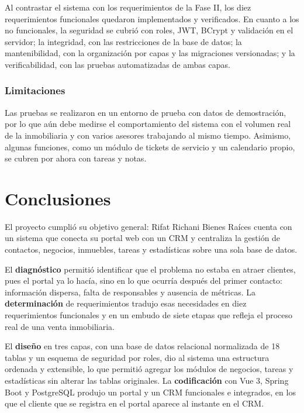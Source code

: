 \documentclass[stu,12pt,letterpaper,donotrepeattitle,floatsintext]{apa7}
\begin{document}
Al contrastar el sistema con los requerimientos de la Fase II, los diez requerimientos funcionales quedaron implementados y verificados. En cuanto a los no funcionales, la seguridad se cubrió con roles, JWT, BCrypt y validación en el servidor; la integridad, con las restricciones de la base de datos; la mantenibilidad, con la organización por capas y las migraciones versionadas; y la verificabilidad, con las pruebas automatizadas de ambas capas.

\subsubsection{Limitaciones}

Las pruebas se realizaron en un entorno de prueba con datos de demostración, por lo que aún debe medirse el comportamiento del sistema con el volumen real de la inmobiliaria y con varios asesores trabajando al mismo tiempo. Asimismo, algunas funciones, como un módulo de tickets de servicio y un calendario propio, se cubren por ahora con tareas y notas.

\section{Conclusiones}

El proyecto cumplió su objetivo general: Rifat Richani Bienes Raíces cuenta con un sistema que conecta su portal web con un CRM y centraliza la gestión de contactos, negocios, inmuebles, tareas y estadísticas sobre una sola base de datos.

El \textbf{diagnóstico} permitió identificar que el problema no estaba en atraer clientes, pues el portal ya lo hacía, sino en lo que ocurría después del primer contacto: información dispersa, falta de responsables y ausencia de métricas. La \textbf{determinación} de requerimientos tradujo esas necesidades en diez requerimientos funcionales y en un embudo de siete etapas que refleja el proceso real de una venta inmobiliaria.

El \textbf{diseño} en tres capas, con una base de datos relacional normalizada de 18 tablas y un esquema de seguridad por roles, dio al sistema una estructura ordenada y extensible, lo que permitió agregar los módulos de negocios, tareas y estadísticas sin alterar las tablas originales. La \textbf{codificación} con Vue 3, Spring Boot y PostgreSQL produjo un portal y un CRM funcionales e integrados, en los que el cliente que se registra en el portal aparece al instante en el CRM.
\end{document}
